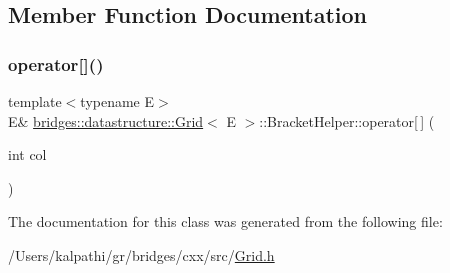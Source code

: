 \subsection{Member Function Documentation}
\mbox{\label{classbridges_1_1datastructure_1_1_grid_1_1_bracket_helper_a4cf644b40ea05506e98f7f0863245ecb}} 
\subsubsection{\texorpdfstring{operator[]()}{operator[]()}}
{\footnotesize\ttfamily template$<$typename E$>$ \\
E\& \mbox{\hyperlink{classbridges_1_1datastructure_1_1_grid}{bridges\+::datastructure\+::\+Grid}}$<$ E $>$\+::Bracket\+Helper\+::operator\mbox{[}$\,$\mbox{]} (\begin{DoxyParamCaption}\item[{int}]{col }\end{DoxyParamCaption})\hspace{0.3cm}{\ttfamily [inline]}}



The documentation for this class was generated from the following file\+:\begin{DoxyCompactItemize}
\item 
/\+Users/kalpathi/gr/bridges/cxx/src/\mbox{\hyperlink{_grid_8h}{Grid.\+h}}\end{DoxyCompactItemize}
